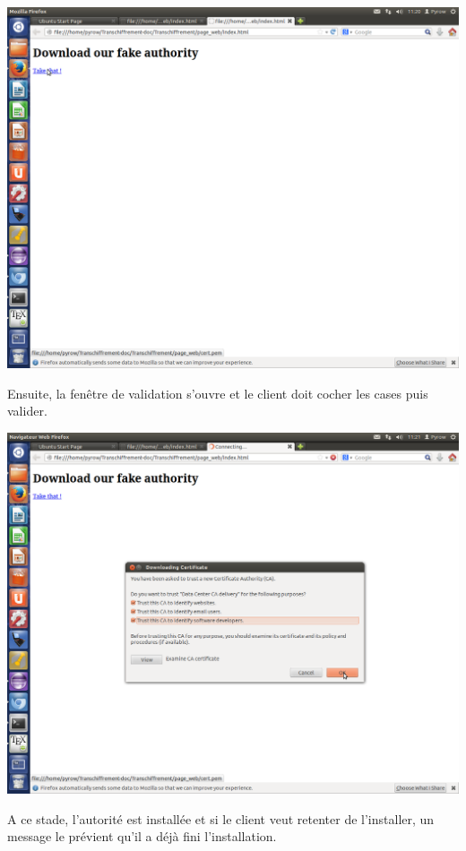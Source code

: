 \documentclass[a4paper,11pt,french]{article}
\begin{document}
\includegraphics[width=\textwidth]{images/Page.png} 
\newpage

Ensuite, la fenêtre de validation s'ouvre et le client doit cocher les cases puis valider.

\includegraphics[width=\textwidth]{images/Cert.png} 
\newpage

A ce stade, l'autorité est installée et si le client veut retenter de l'installer, un message le prévient qu'il a déjà fini l'installation.
\end{document}

